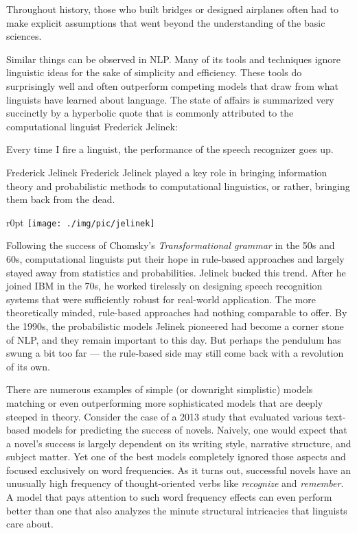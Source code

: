 \begin{fancyquote}
    Throughout history, those who built bridges or designed airplanes often had to make explicit assumptions that went beyond the understanding of the basic sciences.
\end{fancyquote}

Similar things can be observed in NLP\@.
Many of its tools and techniques ignore linguistic ideas for the sake of simplicity and efficiency.
These tools do surprisingly well and often outperform competing models that draw from what linguists have learned about language.
The state of affairs is summarized very succinctly by a hyperbolic quote that is commonly attributed to the computational linguist Frederick Jelinek:

\begin{fancyquote}
    Every time I fire a linguist, the performance of the speech recognizer goes up.
\end{fancyquote}

\begin{person}[1932--2010]{Frederick Jelinek}
Frederick Jelinek played a key role in bringing information theory and probabilistic methods to computational linguistics, or rather, bringing them back from the dead.

\begin{wrapfigure}{r}{0pt}
    \texttt{[image: ./img/pic/jelinek]}
\end{wrapfigure}
Following the success of Chomsky's \emph{Transformational grammar} in the 50s and 60s, computational linguists put their hope in rule-based approaches and largely stayed away from statistics and probabilities.
Jelinek bucked this trend.
After he joined IBM in the 70s, he worked tirelessly on designing speech recognition systems that were sufficiently robust for real-world application.
The more theoretically minded, rule-based approaches had nothing comparable to offer.
By the 1990s, the probabilistic models Jelinek pioneered had become a corner stone of NLP, and they remain important to this day.
But perhaps the pendulum has swung a bit too far --- the rule-based side may still come back with a revolution of its own.
\end{person}

There are numerous examples of simple (or downright simplistic) models matching or even outperforming more sophisticated models that are deeply steeped in theory.
Consider the case of a 2013 study that evaluated various text-based models for predicting the success of novels.
Naively, one would expect that a novel's success is largely dependent on its writing style, narrative structure, and subject matter.
Yet one of the best models completely ignored those aspects and focused exclusively on word frequencies.
As it turns out, successful novels have an unusually high frequency of thought-oriented verbs like \emph{recognize} and \emph{remember}.
A model that pays attention to such word frequency effects can even perform better than one that also analyzes the minute structural intricacies that linguists care about.

